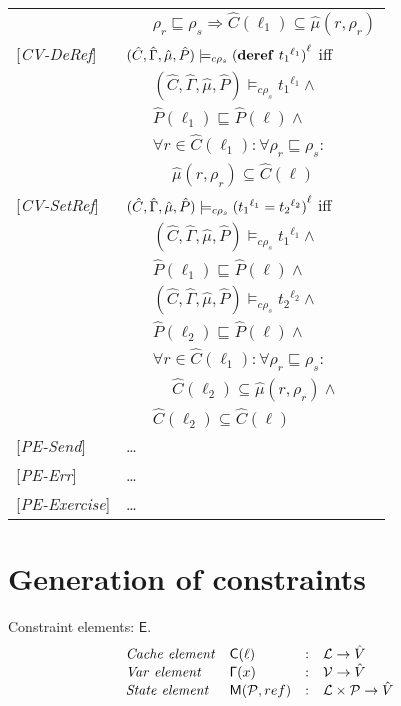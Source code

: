 \documentclass[[12pt,a4paper,twoside,openrigh]{article}
\newcommand{\Cat}[0]{\hat{C}}
\newcommand{\muat}[0]{\hat{\mu}}
\newcommand{\Env}[0]{\hat{\Gamma}}
\newcommand{\Pat}[0]{\hat{P}}
\newcommand{\cenvs}{(\Cat,\Env,\muat,\Pat)}
\newcommand{\ccest}[1]{\cenvs \models_{c \rho_s} #1}
\newcommand{\ccestl}[1]{\cenvs \models_{c \rho_s} {(#1)}^{\ell}}
\newcommand{\lbt}[1]{{t_#1}^{\ell_#1}}
\begin{document}
\begin{tabular} {l l l l}
&&\multicolumn{2}{l}{$\rho_r \sqsubseteq \rho_s \Rightarrow \Cat(\ell_1) \subseteq \muat(r, \rho_r) $}\\
{[\textit{CV-DeRef}]}&\multicolumn{3}{l}{$\ccestl {\deref {\lbt 1}} $ iff}\\
&&\multicolumn{2}{l}{$ \ccest {\lbt 1}\wedge $}\\
&&\multicolumn{2}{l}{$\Pat(\ell_1) \sqsubseteq \Pat(\ell) \wedge$}\\
&&\multicolumn{2}{l}{$\forall r \in \Cat(\ell_1) : \forall \rho_r \sqsubseteq \rho_s :$}\\
&&&$\muat(r, \rho_r) \subseteq \Cat(\ell)$ \\
{[\textit{CV-SetRef}]}&\multicolumn{3}{l}{$\ccestl {\setref {\lbt 1} {\lbt 2}} $ iff}\\
&&\multicolumn{2}{l}{$ \ccest {\lbt 1} \wedge $}\\
&&\multicolumn{2}{l}{$ \Pat(\ell_1) \sqsubseteq \Pat(\ell) \wedge $}\\
&&\multicolumn{2}{l}{$ \ccest {\lbt 2} \wedge $}\\
&&\multicolumn{2}{l}{$ \Pat(\ell_2) \sqsubseteq \Pat(\ell) \wedge $}\\
&&\multicolumn{2}{l}{$ \forall r \in \Cat(\ell_1) : \forall \rho_r \sqsubseteq \rho_s :$}\\
&&&$\Cat(\ell_2) \subseteq \muat(r, \rho_r) \wedge$ \\
&&\multicolumn{2}{l}{$\Cat(\ell_2) \subseteq \Cat(\ell) $} \\
{[\textit{PE-Send}]}& \dots \\
{[\textit{PE-Err}]}& \dots \\
{[\textit{PE-Exercise}]}& \dots \\
\end{tabular}

\section{Generation of constraints}
\newcommand{\genl}[1]{\mathcal{C}_{*\rho_s}\llbracket (#1)^\ell \rrbracket}
\newcommand{\gen}[1]{\mathcal{C}_{*\rho_s}\llbracket (#1) \rrbracket}
\newcommand{\Cel}{\mathsf{C}}
\newcommand{\Rel}{\mathsf{\Gamma}}
\newcommand{\Pel}{\mathsf{P}}
\newcommand{\Mel}{\mathsf{M}}
\newcommand{\El}{\mathsf{E}}
\newcommand{\braces}[1]{\{ #1 \} }
\newcommand{\parens}[1]{\( #1 \) }

Constraint elements: $\El$.
\[
\begin{array}{llcl}
\mathit{Cache\ element} & \Cel(\ell)& : & \labs \rightarrow \absvalues \\
\mathit{Var\ element} & \Rel(x) & : & \vars \rightarrow \absvalues \\
\mathit{State\ element} & \Mel(\perms, ref) & : & \labs \times \perms \rightarrow \absvalues \\
\end{array}
\]
\end{document}
